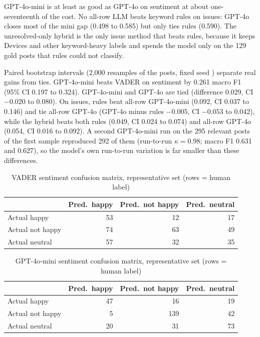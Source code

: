 \documentclass[11pt,a4paper]{article}
\begin{document}
GPT-4o-mini is at least as good as GPT-4o on sentiment at about one-seventeenth of the cost. No all-row LLM beats keyword rules on issues: GPT-4o closes most of the mini gap (0.498 to 0.585) but only ties rules (0.590). The unresolved-only hybrid is the only issue method that beats rules, because it keeps Devices and other keyword-heavy labels and spends the model only on the 129 gold posts that rules could not classify.

Paired bootstrap intervals (2,000 resamples of the posts, fixed seed \cite{efron1993bootstrap}) separate real gains from ties. GPT-4o-mini beats VADER on sentiment by 0.261 macro F1 (95\% CI 0.197 to 0.324). GPT-4o-mini and GPT-4o are tied (difference 0.029, CI $-0.020$ to 0.080). On issues, rules beat all-row GPT-4o-mini (0.092, CI 0.037 to 0.146) and tie all-row GPT-4o (GPT-4o minus rules $-0.005$, CI $-0.053$ to 0.042), while the hybrid beats both rules (0.049, CI 0.024 to 0.074) and all-row GPT-4o (0.054, CI 0.016 to 0.092). A second GPT-4o-mini run on the 295 relevant posts of the first sample reproduced 292 of them (run-to-run $\kappa=0.98$; macro F1 0.631 and 0.627), so the model's own run-to-run variation is far smaller than these differences.

\begin{table}[H]
\centering
\caption{VADER sentiment confusion matrix, representative set (rows = human label)}
\label{tab:cmvader}
\begin{tabular}{lrrr}
\toprule
 & \textbf{Pred.\ happy} & \textbf{Pred.\ not happy} & \textbf{Pred.\ neutral} \\
\midrule
Actual happy & 53 & 12 & 17 \\
Actual not happy & 74 & 63 & 49 \\
Actual neutral & 57 & 32 & 35 \\
\bottomrule
\end{tabular}
\end{table}

\begin{table}[H]
\centering
\caption{GPT-4o-mini sentiment confusion matrix, representative set (rows = human label)}
\label{tab:cmllm}
\begin{tabular}{lrrr}
\toprule
 & \textbf{Pred.\ happy} & \textbf{Pred.\ not happy} & \textbf{Pred.\ neutral} \\
\midrule
Actual happy & 47 & 16 & 19 \\
Actual not happy & 5 & 139 & 42 \\
Actual neutral & 20 & 31 & 73 \\
\bottomrule
\end{tabular}
\end{table}
\end{document}
